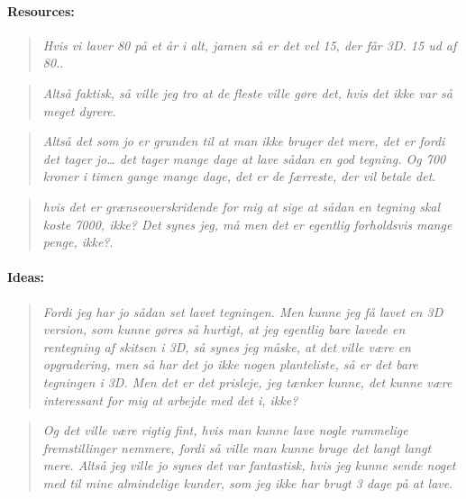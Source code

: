 \paragraph*{Resources:}
\begin{quote}
	\textit{Hvis vi laver 80 på et år i alt, jamen så er det vel 15, der får 3D. 15 ud af 80.}\label{quote:expertRessources1Danish}.\\
\end{quote}

\begin{quote}
	\textit{Altså faktisk, så ville jeg tro at de fleste ville gøre det, hvis det ikke var så meget dyrere}\label{quote:expertRessources2Danish}.\\
\end{quote}

\begin{quote}
	\textit{Altså det som jo er grunden til at man ikke bruger det mere, det er fordi det tager jo… det tager mange dage at lave sådan en god tegning. Og 700 kroner i timen gange mange dage, det er de færreste, der vil betale det}\label{quote:expertRessources3Danish}.\\
\end{quote}

\begin{quote}
	\textit{hvis det er grænseoverskridende for mig at sige at sådan en tegning skal koste 7000, ikke? Det synes jeg, må men det er egentlig forholdsvis mange penge, ikke?}\label{quote:expertRessources4Danish}.\\
\end{quote}

\paragraph*{Ideas:}
\begin{quote}
	\textit{Fordi jeg har jo sådan set lavet tegningen. Men kunne jeg få lavet en 3D version, som kunne gøres så hurtigt, at jeg egentlig bare lavede en rentegning af skitsen i 3D, så synes jeg måske, at det ville være en opgradering, men så har det jo ikke nogen planteliste, så er det bare tegningen i 3D. Men det er det prisleje, jeg tænker kunne, det kunne være interessant for mig at arbejde med det i, ikke?}\label{quote:expertIdeas1DanishDanish}\\
\end{quote}

\begin{quote}
	\textit{Og det ville være rigtig fint, hvis man kunne lave nogle rummelige fremstillinger nemmere, fordi så ville man kunne bruge det langt langt mere. Altså jeg ville jo synes det var fantastisk, hvis jeg kunne sende noget med til mine almindelige kunder, som jeg ikke har brugt 3 dage på at lave}\label{quote:expertIdeas2Danish}.\\
\end{quote}

